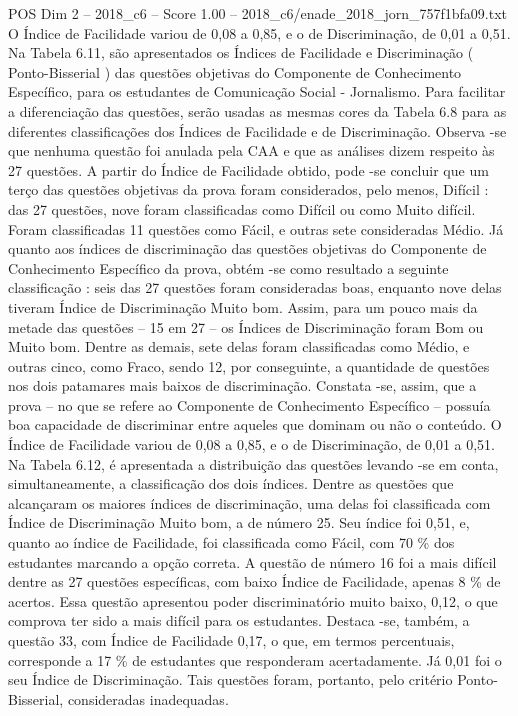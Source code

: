 \begin{textsample}{POS Dim 2 – 2018\_c6 – Score 1.00 – 2018\_c6/enade\_2018\_jorn\_757f1bfa09.txt}
O Índice de Facilidade variou de 0,08 a 0,85, e o de Discriminação, de 0,01 a 0,51.
Na Tabela 6.11, são apresentados os Índices de Facilidade e Discriminação ( Ponto-Bisserial ) das questões objetivas do Componente de Conhecimento Específico, para os estudantes de Comunicação Social - Jornalismo.
Para facilitar a diferenciação das questões, serão usadas as mesmas cores da Tabela 6.8 para as diferentes classificações dos Índices de Facilidade e de Discriminação.
Observa -se que nenhuma questão foi anulada pela CAA e que as análises dizem respeito às 27 questões.
A partir do Índice de Facilidade obtido, pode -se concluir que um terço das questões objetivas da prova foram considerados, pelo menos, Difícil : das 27 questões, nove foram classificadas como Difícil ou como Muito difícil.
Foram classificadas 11 questões como Fácil, e outras sete consideradas Médio.
Já quanto aos índices de discriminação das questões objetivas do Componente de Conhecimento Específico da prova, obtém -se como resultado a seguinte classificação : seis das 27 questões foram consideradas boas, enquanto nove delas tiveram Índice de Discriminação Muito bom.
Assim, para um pouco mais da metade das questões – 15 em 27 – os Índices de Discriminação foram Bom ou Muito bom.
Dentre as demais, sete delas foram classificadas como Médio, e outras cinco, como Fraco, sendo 12, por conseguinte, a quantidade de questões nos dois patamares mais baixos de discriminação.
Constata -se, assim, que a prova – no que se refere ao Componente de Conhecimento Específico – possuía boa capacidade de discriminar entre aqueles que dominam ou não o conteúdo.
O Índice de Facilidade variou de 0,08 a 0,85, e o de Discriminação, de 0,01 a 0,51.
Na Tabela 6.12, é apresentada a distribuição das questões levando -se em conta, simultaneamente, a classificação dos dois índices.
Dentre as questões que alcançaram os maiores índices de discriminação, uma delas foi classificada com Índice de Discriminação Muito bom, a de número 25.
Seu índice foi 0,51, e, quanto ao índice de Facilidade, foi classificada como Fácil, com 70 \% dos estudantes marcando a opção correta.
A questão de número 16 foi a mais difícil dentre as 27 questões específicas, com baixo Índice de Facilidade, apenas 8 \% de acertos.
Essa questão apresentou poder discriminatório muito baixo, 0,12, o que comprova ter sido a mais difícil para os estudantes.
Destaca -se, também, a questão 33, com Índice de Facilidade 0,17, o que, em termos percentuais, corresponde a 17 \% de estudantes que responderam acertadamente.
Já 0,01 foi o seu Índice de Discriminação.
Tais questões foram, portanto, pelo critério Ponto-Bisserial, consideradas inadequadas.

\end{textsample}
